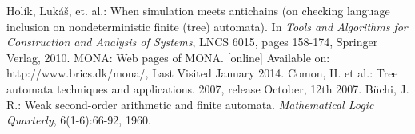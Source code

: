 \documentclass{eeict}
\begin{document}
\begin{thebibliography}{9}
Hol\'{i}k, Luk\'{a}\v{s}, et. al.: When simulation meets
antichains (on checking language inclusion on nondeterministic finite (tree) automata). In
  \emph{Tools and Algorithms for Construction and Analysis of Systems}, LNCS
  6015, pages 158-174, Springer Verlag, 2010.
  MONA:
  Web pages of MONA.
  [online] Available on:
  http://www.brics.dk/mona/, Last Visited January 2014.
  Comon, H. et al.: Tree automata techniques and applications.
  2007, release October, 12th 2007.
  Büchi, J. R.: Weak second-order arithmetic and finite automata.
  \emph{Mathematical Logic Quarterly}, 6(1-6):66-92, 1960.
\end{thebibliography}
\end{document}
